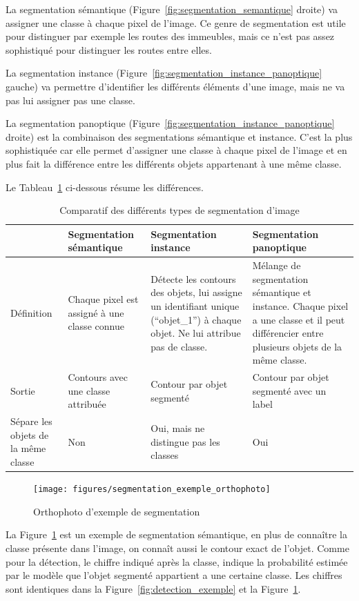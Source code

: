 La segmentation sémantique (Figure~\ref{fig:segmentation_semantique} droite) va assigner une classe à chaque pixel de l'image. Ce genre de segmentation est utile pour distinguer par exemple les routes des immeubles, mais ce n'est pas assez sophistiqué pour distinguer les routes entre elles.

La segmentation instance (Figure~\ref{fig:segmentation_instance_panoptique} gauche) va permettre d'identifier les différents éléments d'une image, mais ne va pas lui assigner pas une classe.

La segmentation panoptique (Figure~\ref{fig:segmentation_instance_panoptique} droite) est la combinaison des segmentations sémantique et instance. C'est la plus sophistiquée car elle permet d'assigner une classe à chaque pixel de l'image et en plus fait la différence entre les différents objets appartenant à une même classe.

Le Tableau~\ref{tab:comparatif_segmentation} ci-dessous résume les différences.

\begin{table}[htbp]
    \centering
    \caption{Comparatif des différents types de segmentation d'image}
    \label{tab:comparatif_segmentation}
    \begin{tabular}{|p{3cm}|p{3.5cm}|p{3.5cm}|p{3.5cm}|}
    \hline
    & \textbf{Segmentation sémantique} & \textbf{Segmentation instance} & \textbf{Segmentation panoptique} \\
    \hline
    Définition & Chaque pixel est assigné à une classe connue & Détecte les contours des objets, lui assigne un identifiant unique (``objet\_1'') à chaque objet. Ne lui attribue pas de classe. & Mélange de segmentation sémantique et instance. Chaque pixel a une classe et il peut différencier entre plusieurs objets de la même classe. \\
    \hline
    Sortie & Contours avec une classe attribuée & Contour par objet segmenté & Contour par objet segmenté avec un label \\
    \hline
    Sépare les objets de la même classe & Non & Oui, mais ne distingue pas les classes & Oui \\
    \hline
    \end{tabular}
\end{table}

\begin{figure}[htbp]
    \centering
    \texttt{[image: figures/segmentation\_exemple\_orthophoto]}
    \caption{Orthophoto d'exemple de segmentation \citep{sitg_orthophoto_2024}}
    \label{fig:segmentation_exemple_orthophoto}
\end{figure}

La Figure~\ref{fig:segmentation_exemple_orthophoto} est un exemple de segmentation sémantique, en plus de connaître la classe présente dans l'image, on connaît aussi le contour exact de l'objet. Comme pour la détection, le chiffre indiqué après la classe, indique la probabilité estimée par le modèle que l'objet segmenté appartient a une certaine classe. Les chiffres sont identiques dans la Figure~\ref{fig:detection_exemple} et la Figure~\ref{fig:segmentation_exemple_orthophoto}.




